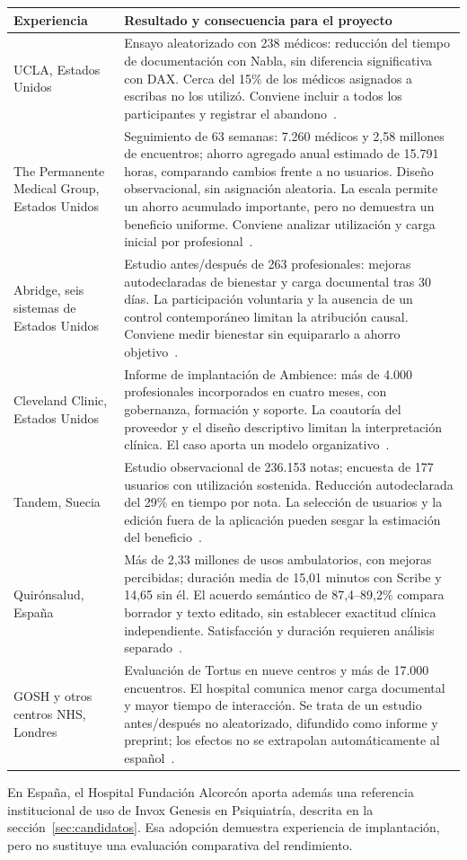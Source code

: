 \begin{small}
\begin{longtable}{L{.23\linewidth}L{.69\linewidth}}
\toprule
Experiencia & Resultado y consecuencia para el proyecto \\
\midrule\endhead
UCLA, Estados Unidos & Ensayo aleatorizado con 238 médicos: reducción del tiempo de documentación con Nabla, sin diferencia significativa con DAX. Cerca del 15\% de los médicos asignados a escribas no los utilizó. Conviene incluir a todos los participantes y registrar el abandono~\cite{PR93N8FN}. \\
The Permanente Medical Group, Estados Unidos & Seguimiento de 63 semanas: 7.260 médicos y 2,58 millones de encuentros; ahorro agregado anual estimado de 15.791 horas, comparando cambios frente a no usuarios. Diseño observacional, sin asignación aleatoria. La escala permite un ahorro acumulado importante, pero no demuestra un beneficio uniforme. Conviene analizar utilización y carga inicial por profesional~\cite{tierney2025}. \\
Abridge, seis sistemas de Estados Unidos & Estudio antes/después de 263 profesionales: mejoras autodeclaradas de bienestar y carga documental tras 30 días. La participación voluntaria y la ausencia de un control contemporáneo limitan la atribución causal. Conviene medir bienestar sin equipararlo a ahorro objetivo~\cite{olson2025}. \\
Cleveland Clinic, Estados Unidos & Informe de implantación de Ambience: más de 4.000 profesionales incorporados en cuatro meses, con gobernanza, formación y soporte. La coautoría del proveedor y el diseño descriptivo limitan la interpretación clínica. El caso aporta un modelo organizativo~\cite{F5FVUMMX}. \\
Tandem, Suecia & Estudio observacional de 236.153 notas; encuesta de 177 usuarios con utilización sostenida. Reducción autodeclarada del 29\% en tiempo por nota. La selección de usuarios y la edición fuera de la aplicación pueden sesgar la estimación del beneficio~\cite{C7S8N9NA}. \\
Quirónsalud, España & Más de 2,33 millones de usos ambulatorios, con mejoras percibidas; duración media de 15,01 minutos con Scribe y 14,65 sin él. El acuerdo semántico de 87,4--89,2\% compara borrador y texto editado, sin establecer exactitud clínica independiente. Satisfacción y duración requieren análisis separado~\cite{U5GHQW86}. \\
GOSH y otros centros NHS, Londres & Evaluación de Tortus en nueve centros y más de 17.000 encuentros. El hospital comunica menor carga documental y mayor tiempo de interacción. Se trata de un estudio antes/después no aleatorizado, difundido como informe y preprint; los efectos no se extrapolan automáticamente al español~\cite{gosh2025,wray2025}. \\
\bottomrule
\end{longtable}
\end{small}
En España, el Hospital Fundación Alcorcón aporta además una referencia institucional de uso de Invox Genesis en Psiquiatría, descrita en la sección~\ref{sec:candidatos}. Esa adopción demuestra experiencia de implantación, pero no sustituye una evaluación comparativa del rendimiento.

